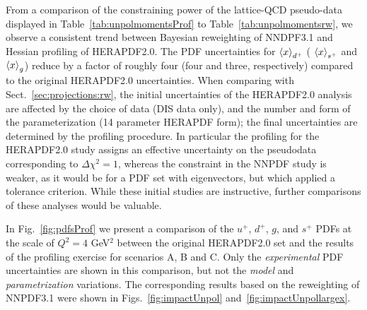 From a comparison of the constraining power of the lattice-QCD pseudo-data  
displayed in Table~\ref{tab:unpolmomentsProf} to Table~\ref{tab:unpolmomentsrw},
we observe a consistent trend between Bayesian reweighting of NNDPF3.1 and 
Hessian profiling of HERAPDF2.0.
%
The PDF uncertainties for $\left\langle x\right\rangle_{d^+}$ ( $\left\langle x\right\rangle_{s^+}$
and  $\left\langle x\right\rangle_g$) reduce by a factor of roughly
four (four and three, respectively) compared to the original
HERAPDF2.0 uncertainties.
%
When comparing with Sect.~\ref{sec:projections:rw},
the initial uncertainties of the HERAPDF2.0  analysis 
are affected by the choice of data (DIS data only), and 
the number and form of the parameterization (14 parameter HERAPDF form);
the final uncertainties are determined by the profiling procedure. 
%
In particular the profiling for the HERAPDF2.0 study assigns an effective 
uncertainty on the pseudodata corresponding to $\Delta\chi^2=1$, whereas the 
constraint in the NNPDF study is weaker, as it would be for a PDF set with 
eigenvectors, but which applied a tolerance criterion. 
%
While these initial studies are instructive, 
further comparisons of these analyses would be valuable. 

In Fig.~\ref{fig:pdfsProf} we present a comparison of the
$u^+$, $d^+$, $g$, and $s^+$ PDFs at the scale of $Q^2=4$ GeV$^2$
between the original  HERAPDF2.0 set and the results of the profiling
exercise for scenarios A, B and C.
%
Only the {\it experimental} PDF uncertainties are shown in this comparison,
but not the {\it model} and {\it parametrization} variations.
%
The corresponding results based on the reweighting
of NNPDF3.1 were shown in Figs.~\ref{fig:impactUnpol}
and~\ref{fig:impactUnpollargex}.


